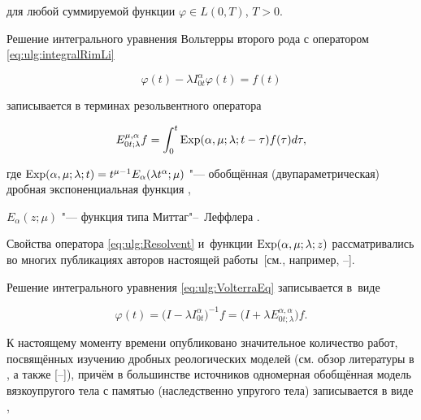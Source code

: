 для любой суммируемой функции $\varphi\in L(0, T)$, $T>0$.

Решение интегрального уравнения Вольтерры второго рода с оператором \eqref{eq:ulg:integralRimLi}

\begin{equation}\label{eq:ulg:VolterraEq}

\varphi(t)-\lambda I^{\alpha}_{0t}\varphi(t)=f(t)

\end{equation}

записывается в терминах резольвентного оператора

\begin{equation}\label{eq:ulg:Resolvent}

E^{\mu,\alpha}_{0t;\lambda}f=\int ^{t}_{0}  \mathop{\rm Exp}\nolimits  (\alpha,\mu;\lambda;t-\tau)f(\tau)d\tau,

\end{equation}

где $  \mathop{\rm Exp}\nolimits  (\alpha,\mu;\lambda;t)=t^{\mu-1}E_{\alpha}(\lambda t^{\alpha};\mu)$ "---  обобщённая (двупараметрическая) дробная экспоненциальная функция \cite{ulg:bib:Ogorodnikov_Some_Special_Functions}, 

$E_{\alpha}(z;\mu)$ "---  функция типа Миттаг"--~Леффлера \cite{ulg:bib:Djrbashyan1966}. 

Свойства оператора  \eqref{eq:ulg:Resolvent} и~функции $  \mathop{\rm Exp}\nolimits  (\alpha,\mu;\lambda;z)$ рассматривались во многих публикациях авторов настоящей работы~[см., например, --]. 

Решение интегрального уравнения \eqref{eq:ulg:VolterraEq} записывается в~виде

\begin{equation}\label{eq:ulg:VolterraSolution}

\varphi(t)=\bigl(I-\lambda I^{\alpha}_{0t}\bigr)^{-1}f=\bigl(I+\lambda E^{\alpha,\alpha}_{0t;\lambda}\bigr)f.

\end{equation}



К настоящему моменту времени опубликовано значительное количество работ, посвящённых изучению дробных реологических моделей (см. обзор литературы в \cite{ulg:bib:Mainardi2010}, а также [--]), причём в большинстве источников одномерная обобщённая модель вязкоупругого тела с памятью (наследственно упругого тела) записывается в виде \cite[с.~202]{ulg:bib:Bagley_theoretical_basis}, \cite[с.~742]{ulg:bib:Bagley_Fractional_Calculus}

